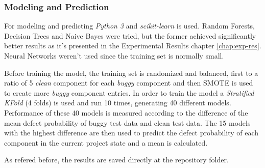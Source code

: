 \subsubsection{Modeling and Prediction}

For modeling and predicting \emph{Python 3} and \emph{scikit-learn} is used.
Random Forests, Decision Trees and Naive Bayes were tried, but the former achieved significantly better results as it's presented in the Experimental Results chapter \ref{chap:exp-res}.
Neural Networks weren't used since the training set is normally small.

Before training the model, the training set is randomized and balanced, first to a ratio of 5 \emph{clean} component for each \emph{buggy} component 
and then SMOTE is used to create more \emph{buggy} component entries. In order to train the model a \emph{Stratified KFold} (4 folds) is used and run 10 times, 
generating 40 different models. Performance of these 40 models is measured according to the difference of the mean defect probability of buggy test data and clean test data. 
The 15 models with the highest difference are then used to predict the defect probability of each component in the current project state and a mean is calculated.

As refered before, the results are saved directly at the repository folder.
